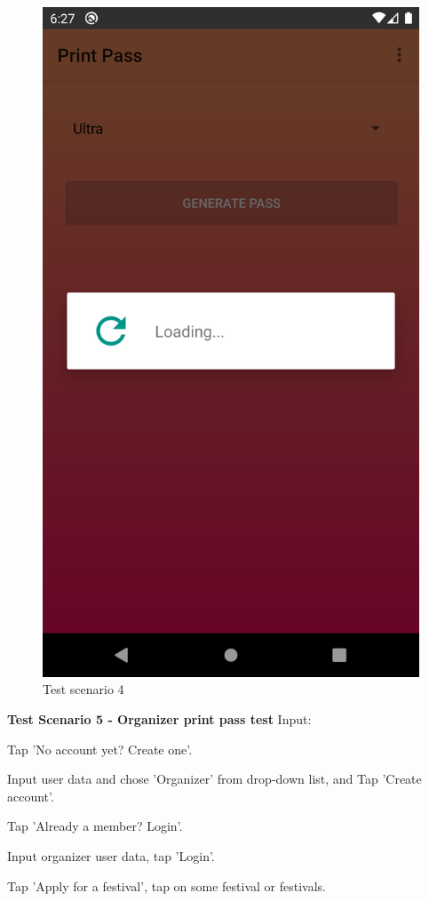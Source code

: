 			\begin{figure}[H]
				\includegraphics[width=\linewidth]{images/test_Screens/test_scenario_4-3.png}
				\caption{Test scenario 4}
				\label{fig:espresso_4_3}
			\end{figure}
		
			\textbf{Test Scenario 5 - Organizer print pass test}
			Input:
			\begin{packed_enum}
				\item Tap 'No account yet? Create one'.
				\item Input user data and chose 'Organizer' from drop-down list, and Tap 'Create account'.
				\item Tap 'Already a member? Login'.
				\item Input organizer user data, tap 'Login'.
				\item Tap 'Apply for a festival', tap on some festival or festivals.
			\end{packed_enum}
			
